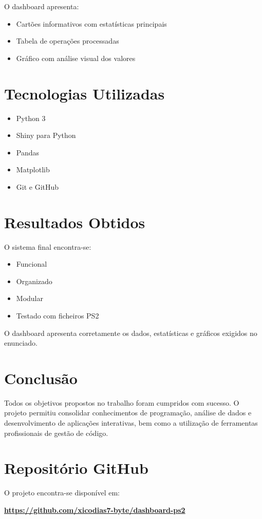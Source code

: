 \documentclass[12pt]{article}
\begin{document}
O dashboard apresenta:
\begin{itemize}
\item Cartões informativos com estatísticas principais
\item Tabela de operações processadas
\item Gráfico com análise visual dos valores
\end{itemize}

\section{Tecnologias Utilizadas}

\begin{itemize}
\item Python 3
\item Shiny para Python
\item Pandas
\item Matplotlib
\item Git e GitHub
\end{itemize}

\section{Resultados Obtidos}

O sistema final encontra-se:
\begin{itemize}
\item Funcional
\item Organizado
\item Modular
\item Testado com ficheiros PS2
\end{itemize}

O dashboard apresenta corretamente os dados, estatísticas e gráficos exigidos no enunciado.

\section{Conclusão}

Todos os objetivos propostos no trabalho foram cumpridos com sucesso.  
O projeto permitiu consolidar conhecimentos de programação, análise de dados e desenvolvimento de aplicações interativas, bem como a utilização de ferramentas profissionais de gestão de código.

\section{Repositório GitHub}

O projeto encontra-se disponível em:

\begin{center}
\textbf{\url{https://github.com/xicodias7-byte/dashboard-ps2}}
\end{center}
\end{document}
